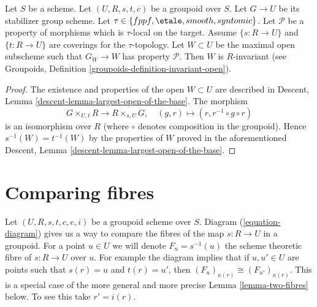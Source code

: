 \begin{lemma}
\label{lemma-property-G-invariant}
Let $S$ be a scheme.
Let $(U, R, s, t, c)$ be a groupoid over $S$.
Let $G \to U$ be its stabilizer group scheme.
Let $\tau \in \{fppf, \linebreak[0] \etale, \linebreak[0]
smooth, \linebreak[0] syntomic\}$.
Let $\mathcal{P}$ be a property of morphisms which is $\tau$-local
on the target. Assume $\{s : R \to U\}$ and $\{t : R \to U\}$ are coverings
for the $\tau$-topology. Let $W \subset U$ be the maximal open subscheme
such that $G_W \to W$ has property $\mathcal{P}$. Then $W$ is $R$-invariant
(see
Groupoids, Definition
\ref{groupoids-definition-invariant-open}).
\end{lemma}

\begin{proof}
The existence and properties of the open $W \subset U$ are described in
Descent, Lemma \ref{descent-lemma-largest-open-of-the-base}.
The morphism
$$
G \times_{U, t} R \longrightarrow R \times_{s, U} G, \quad
(g, r) \longmapsto (r, r^{-1} \circ g \circ r)
$$
is an isomorphism over $R$ (where $\circ$ denotes
composition in the groupoid). Hence $s^{-1}(W) = t^{-1}(W)$ by the
properties of $W$ proved in the aforementioned
Descent, Lemma \ref{descent-lemma-largest-open-of-the-base}.
\end{proof}



\section{Comparing fibres}
\label{section-fibres}

\noindent
Let $(U, R, s, t, c, e, i)$ be a groupoid scheme over $S$.
Diagram (\ref{equation-diagram})
gives us a way to compare the fibres of the map $s : R \to U$ in a groupoid.
For a point $u \in U$ we will denote $F_u = s^{-1}(u)$ the scheme
theoretic fibre of $s : R \to U$ over $u$. For example the diagram
implies that if $u, u' \in U$ are points such
that $s(r) = u$ and $t(r) = u'$, then
$(F_u)_{\kappa(r)} \cong (F_{u'})_{\kappa(r)}$.
This is a special case of the more general and more precise
Lemma \ref{lemma-two-fibres}
below. To see this take $r' = i(r)$.

